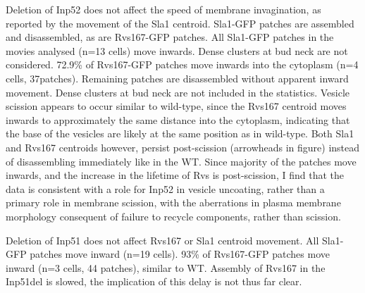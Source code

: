 	\vspace{5mm}
	Deletion of Inp52 does not affect the speed of membrane invagination, as reported by the movement of the Sla1 centroid. Sla1-GFP patches are assembled and disassembled, as are Rvs167-GFP patches. All Sla1-GFP patches in the movies analysed (n=13 cells) move inwards.  Dense clusters at bud neck are not considered. 72.9\% of Rvs167-GFP patches move inwards into the cytoplasm (n=4 cells, 37patches). Remaining patches are disassembled without apparent inward movement. Dense clusters at bud neck are not included in the statistics. Vesicle scission appears to occur similar to wild-type, since the Rvs167 centroid moves inwards to approximately the same distance into the cytoplasm, indicating that the base of the vesicles are likely at the same position as in wild-type. Both Sla1 and Rvs167 centroids however, persist post-scission (arrowheads in figure) instead of disassembling immediately like in the WT. Since majority of the patches move inwards, and the increase in the lifetime of Rvs is post-scission, I find that the data is consistent with a role for Inp52 in vesicle uncoating, rather than a primary role in membrane scission, with the aberrations in plasma membrane morphology consequent of failure to recycle components, rather than scission. 

	\vspace{5mm}
	Deletion of Inp51 does not affect Rvs167 or Sla1 centroid movement. All Sla1-GFP patches move inward (n=19 cells). 93\% of Rvs167-GFP patches move inward (n=3 cells, 44 patches), similar to WT. Assembly of Rvs167 in the Inp51del is slowed, the implication of this delay is not thus far clear. 

